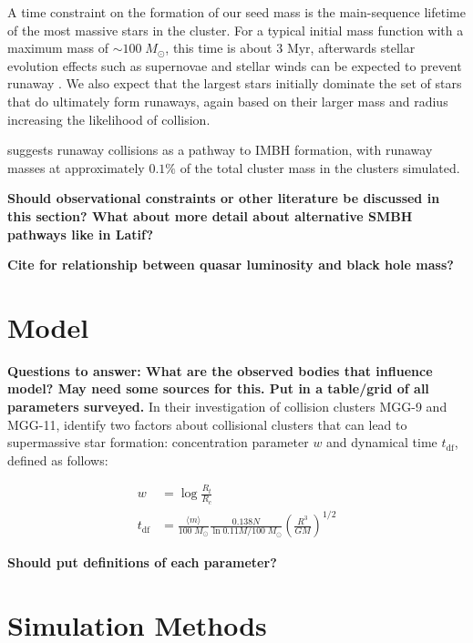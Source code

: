 \documentclass[preprint1]{aastex}
\newcommand\Msun{\; M_\odot}
\newcommand\Myr{\mbox{ Myr}}
\numberwithin{equation}{section}
\begin{document}
A time constraint on the formation of our seed mass is the main-sequence lifetime of the most massive stars in the cluster. For a typical initial mass function with a maximum mass of $\sim100 \Msun$, this time is about $3 \Myr$, afterwards stellar evolution effects such as supernovae and stellar winds can be expected to prevent runaway \citep{2002SPZ, 2016Latif}.  We also expect that the largest stars initially dominate the set of stars that do ultimately form runaways, again based on their larger mass and radius increasing the likelihood of collision.

\citet{2002SPZ} suggests runaway collisions as a pathway to \ac{IMBH} formation, with runaway masses at approximately $0.1\%$ of the total cluster mass in the clusters simulated.  \citet{2004SPZ} 

\textbf{Should observational constraints or other literature be discussed in this section?  What about more detail about alternative \ac{SMBH} pathways like in Latif?}

\textbf{Cite for relationship between quasar luminosity and black hole mass?}

\section{Model} \label{Model}
\textbf{Questions to answer:
What are the observed bodies that influence model?  May need some sources for this.
Put in a table/grid of all parameters surveyed.}
In their investigation of collision clusters MGG-9 and MGG-11, \citet{2004SPZ} identify two factors about collisional clusters that can lead to supermassive star formation: concentration parameter $w$ and dynamical time $t_{\mathrm{df}}$, defined as follows:

\begin{subequations}
    \begin{align*}
    w &= \log{\frac{R_t}{R_c}} \\
    t_{\mathrm{df}} &= \frac{\langle m \rangle}{100 \Msun} \frac{0.138N}{\ln{0.11M/100\Msun}}\left(\frac{R^3}{GM}\right)^{1/2}
    \end{align*}
\end{subequations} 

\textbf{Should put definitions of each parameter?}

\textbf{}


\section{Simulation Methods} \label{Methods}
\end{document}
